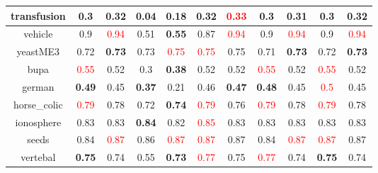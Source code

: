 \documentclass{article}%
\begin{document}
\begin{tabular}{c|cccccccccc}
\hline%
transfusion&0.3&\textbf{0.32}&0.04&\textbf{0.18}&0.32&\textcolor{red}{ 
0.33
}&0.3&\textbf{0.31}&0.3&\textbf{0.32}\\%
\hline%
vehicle&0.9&\textcolor{red}{ 
0.94
}&0.51&\textbf{0.55}&0.87&\textcolor{red}{ 
0.94
}&0.9&\textcolor{red}{ 
0.94
}&0.9&\textcolor{red}{ 
0.94
}\\%
\hline%
yeastME3&0.72&\textbf{0.73}&0.73&\textcolor{red}{ 
0.75
}&\textcolor{red}{ 
0.75
}&0.75&0.71&\textbf{0.73}&0.72&\textbf{0.73}\\%
\hline%
bupa&\textcolor{red}{ 
0.55
}&0.52&0.3&\textbf{0.38}&0.52&0.52&\textcolor{red}{ 
0.55
}&0.52&\textcolor{red}{ 
0.55
}&0.52\\%
\hline%
german&\textbf{0.49}&0.45&\textbf{0.37}&0.21&0.46&\textbf{0.47}&\textbf{0.48}&0.45&\textcolor{red}{ 
0.5
}&0.45\\%
\hline%
horse\_colic&\textcolor{red}{ 
0.79
}&0.78&0.72&\textbf{0.74}&\textcolor{red}{ 
0.79
}&0.76&\textcolor{red}{ 
0.79
}&0.78&\textcolor{red}{ 
0.79
}&0.78\\%
\hline%
ionosphere&0.83&0.83&\textbf{0.84}&0.82&\textcolor{red}{ 
0.85
}&0.83&0.83&0.83&0.83&0.83\\%
\hline%
seeds&0.84&\textcolor{red}{ 
0.87
}&0.86&\textcolor{red}{ 
0.87
}&\textcolor{red}{ 
0.87
}&0.87&0.84&\textcolor{red}{ 
0.87
}&\textcolor{red}{ 
0.87
}&0.87\\%
\hline%
vertebal&\textbf{0.75}&0.74&0.55&\textbf{0.73}&\textcolor{red}{ 
0.77
}&0.75&\textcolor{red}{ 
0.77
}&0.74&\textbf{0.75}&0.74\\%
\hline%
\end{tabular}

%
\end{document}
